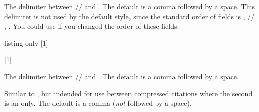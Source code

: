 \documentclass{ltxdockit}
\begin{document}
\begin{ltxsyntax}
The delimiter between //%
 and .
The default is a comma followed by a space.
This delimiter is not used by the default style, since the standard order of
fields is , //%
, .
You could use  if you changed the order of these fields.
\begin{tcblisting}{listing only}
[1]{%
  \newunit}
\end{tcblisting}
\begin{tcolorbox}
\renewcommand*{\publocdelim}{\textcolor{highlight1}{\textbf{\addcomma\textvisiblespace}}}
\renewcommand*{\locdatedelim}{\textcolor{highlight2}{\textbf{\addcomma\textvisiblespace}}}
[1]{%
  \setunit*{\publocdelim}%
  \setunit*{\locdatedelim}%
  \newunit}
\makeatletter\bbx@opt@mergedate@false\makeatother
{}
\end{tcolorbox}


The delimiter between //%
 and .
The default is a comma followed by a space.
\begin{tcolorbox}
\renewcommand*{\pubdatedelim}{\textcolor{highlight1}{\textbf{\addcomma\textvisiblespace}}}
\makeatletter\bbx@opt@mergedate@false\makeatother
{}
\end{tcolorbox}

Similar to , but indended for use between compressed
citations where the second is an  only.
The default is a comma (\emph{not} followed by a space).
\end{ltxsyntax}
\begin{tcolorbox}
\renewcommand*{\extradateonlycompcitedelim}{\textcolor{highlight1}{\textbf{\addcomma}}}
\cite{knuth:ct:b,knuth:ct:c}
\end{tcolorbox}
\end{document}
